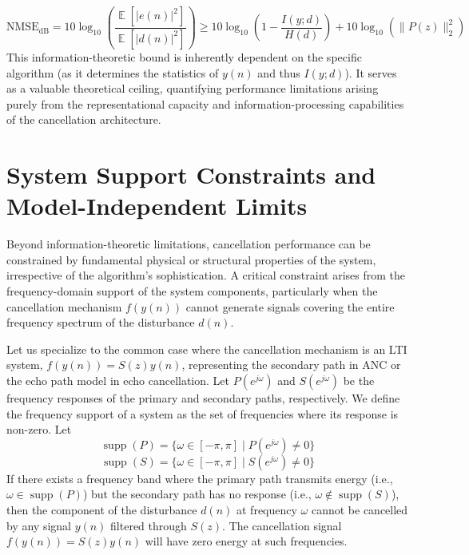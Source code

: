 \documentclass{article}
\DeclareMathOperator{\E}{\mathbb{E}} %
\begin{document}
\begin{equation}
\mathrm{NMSE}_{\mathrm{dB}} = 10 \log_{10} \left( \frac{\E[|e(n)|^2]}{\E[|d(n)|^2]} \right) \geq 10 \log_{10} \left( 1 - \frac{I(y; d)}{H(d)} \right) + 10\log_{10}(\|P(z)\|_2^2)
\label{eq:info-nmse_elaborated}
\end{equation}
This information-theoretic bound is inherently dependent on the specific algorithm (as it determines the statistics of \(y(n)\) and thus \(I(y;d)\)). It serves as a valuable theoretical ceiling, quantifying performance limitations arising purely from the representational capacity and information-processing capabilities of the cancellation architecture.

\section{System Support Constraints and Model-Independent Limits}

Beyond information-theoretic limitations, cancellation performance can be constrained by fundamental physical or structural properties of the system, irrespective of the algorithm's sophistication. A critical constraint arises from the frequency-domain support of the system components, particularly when the cancellation mechanism \( f(y(n)) \) cannot generate signals covering the entire frequency spectrum of the disturbance \( d(n) \).

Let us specialize to the common case where the cancellation mechanism is an LTI system, \( f(y(n)) = S(z)y(n) \), representing the secondary path in ANC or the echo path model in echo cancellation. Let \( P(e^{j\omega}) \) and \( S(e^{j\omega}) \) be the frequency responses of the primary and secondary paths, respectively. We define the frequency support of a system as the set of frequencies where its response is non-zero. Let
$$ \operatorname{supp}(P) = \{ \omega \in [-\pi, \pi] \mid P(e^{j\omega}) \neq 0 \} $$
$$ \operatorname{supp}(S) = \{ \omega \in [-\pi, \pi] \mid S(e^{j\omega}) \neq 0 \} $$
If there exists a frequency band where the primary path transmits energy (i.e., \( \omega \in \operatorname{supp}(P) \)) but the secondary path has no response (i.e., \( \omega \notin \operatorname{supp}(S) \)), then the component of the disturbance \( d(n) \) at frequency \( \omega \) cannot be cancelled by any signal \( y(n) \) filtered through \( S(z) \). The cancellation signal \( f(y(n)) = S(z)y(n) \) will have zero energy at such frequencies.
\end{document}
